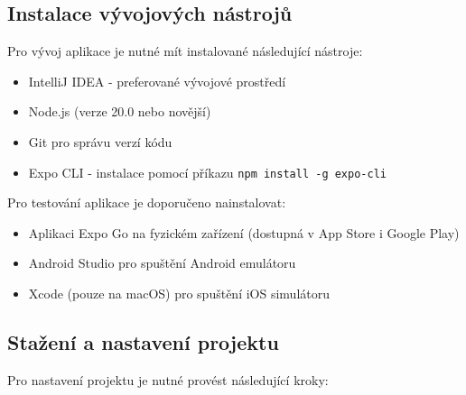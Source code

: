 \documentclass[czech, bp, kiv, he, iso690numb, pdf]{fasthesis}
\begin{document}
    \subsection{Instalace vývojových nástrojů}
    \label{subsec:dev-tools}

    Pro vývoj aplikace je nutné mít instalované následující nástroje:

    \begin{itemize}
        \item IntelliJ IDEA - preferované vývojové prostředí
        \item Node.js (verze 20.0 nebo novější)
        \item Git pro správu verzí kódu
        \item Expo CLI - instalace pomocí příkazu \texttt{npm install -g expo-cli}
    \end{itemize}

    Pro testování aplikace je doporučeno nainstalovat:

    \begin{itemize}
        \item Aplikaci Expo Go na fyzickém zařízení (dostupná v App Store i Google Play)
        \item Android Studio pro spuštění Android emulátoru
        \item Xcode (pouze na macOS) pro spuštění iOS simulátoru
    \end{itemize}

    \subsection{Stažení a nastavení projektu}
    \label{subsec:project-setup}

    Pro nastavení projektu je nutné provést následující kroky:
\end{document}
